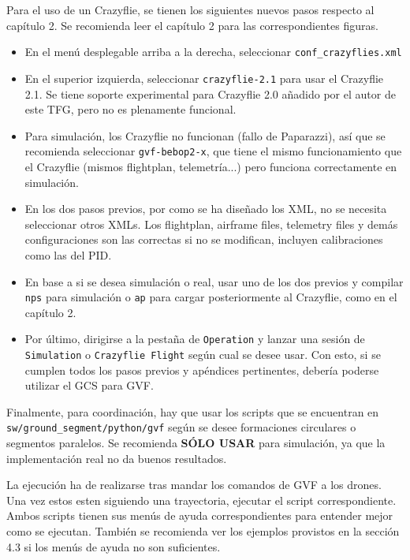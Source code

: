 Para el uso de un Crazyflie, se tienen los siguientes nuevos pasos respecto al capítulo 2. Se recomienda leer el capítulo 2 para las correspondientes figuras.

\begin{itemize}
    \item En el menú desplegable arriba a la derecha, seleccionar \texttt{conf\_crazyflies.xml}
    \item En el superior izquierda, seleccionar \texttt{crazyflie-2.1} para usar el Crazyflie 2.1. 
    Se tiene soporte experimental para Crazyflie 2.0 añadido por el autor de este TFG, pero no es plenamente funcional.
    \item Para simulación, los Crazyflie no funcionan (fallo de Paparazzi), así que se recomienda seleccionar \texttt{gvf-bebop2-x},
    que tiene el mismo funcionamiento que el Crazyflie (mismos flightplan, telemetría...) pero funciona correctamente en simulación.
    \item En los dos pasos previos, por como se ha diseñado los XML, no se necesita seleccionar otros XMLs. 
    Los flightplan, airframe files, telemetry files y demás configuraciones son las correctas si no se modifican, incluyen calibraciones como las del PID.
    \item En base a si se desea simulación o real, usar uno de los dos previos y compilar \texttt{nps} para simulación o \texttt{ap} para cargar posteriormente al Crazyflie, como en el capítulo 2.
    \item Por último, dirigirse a la pestaña de \texttt{Operation} y lanzar una sesión de \texttt{Simulation} o \texttt{Crazyflie Flight} según cual se desee usar. Con esto, si se cumplen todos los pasos previos y apéndices pertinentes, debería poderse utilizar el GCS para GVF.
\end{itemize}

Finalmente, para coordinación, hay que usar los scripts que se encuentran en
\texttt{sw/ground\_segment/python/gvf} según se desee formaciones circulares o segmentos paralelos. 
Se recomienda \textbf{SÓLO USAR} para simulación, ya que la implementación real no da buenos resultados. 

La ejecución ha de realizarse tras mandar los comandos de GVF a los drones. Una vez estos esten siguiendo una trayectoria, ejecutar el script correspondiente.
Ambos scripts tienen sus menús de ayuda correspondientes para entender mejor como se ejecutan.
También se recomienda ver los ejemplos provistos en la sección 4.3 si los menús de ayuda no son suficientes.

